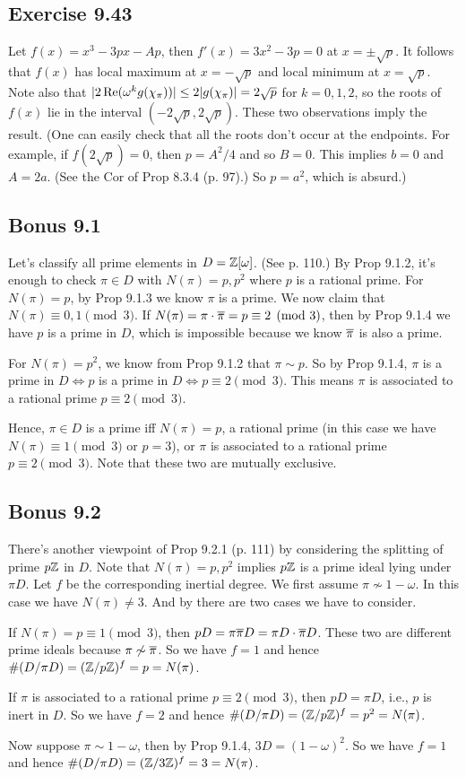 \documentclass[../I&R.tex]{subfiles}
\begin{document}
\subsection*{Exercise 9.43}

Let $f(x)=x^3-3px-Ap$, then $f'(x)=3x^2-3p=0$ at $x=\pm\sqrt{p}$. It follows that $f(x)$ has local maximum at $x=-\sqrt{p}$ and local minimum at $x=\sqrt{p}$. Note also that $|2\operatorname{Re}(\omega^kg(\chi_\pi))|\leq2|g(\chi_\pi)|=2\sqrt{p}$ for $k=0,1,2$, so the roots of $f(x)$ lie in the interval $(-2\sqrt{p},2\sqrt{p})$. These two observations imply the result. (One can easily check that all the roots don't occur at the endpoints. For example, if $f(2\sqrt{p})=0$, then $p=A^2/4$ and so $B=0$. This implies $b=0$ and $A=2a$. (See the Cor of Prop 8.3.4 (p. 97).) So $p=a^2$, which is absurd.)

\subsection*{Bonus 9.1} \label{Bonus 9.1}

Let's classify all prime elements in $D=\mathbb{Z}[\omega]$. (See p. 110.) By Prop 9.1.2, it's enough to check $\pi\in D$ with $N(\pi)=p,p^2$ where $p$ is a rational prime. For $N(\pi)=p$, by Prop 9.1.3 we know $\pi$ is a prime. We now claim that $N(\pi)\equiv0,1\pmod{3}$. If $N(\pi)=\pi\cdot\overline{\pi}=p\equiv2\pmod{3}$, then by Prop 9.1.4 we have $p$ is a prime in $D$, which is impossible because we know $\overline{\pi}$ is also a prime.

For $N(\pi)=p^2$, we know from Prop 9.1.2 that $\pi\sim p$. So by Prop 9.1.4, $\pi$ is a prime in $D \iff p$ is a prime in $D\iff p\equiv 2\pmod{3}$. This means $\pi$ is associated to a rational prime $p\equiv 2\pmod{3}$.

Hence, $\pi\in D$ is a prime iff $N(\pi)=p$, a rational prime (in this case we have $N(\pi)\equiv1\pmod{3}$ or $p=3$), or $\pi$ is associated to a rational prime $p\equiv 2\pmod{3}$. Note that these two are mutually exclusive.

\subsection*{Bonus 9.2}

There's another viewpoint of Prop 9.2.1 (p. 111) by considering the splitting of prime $p\mathbb{Z}$ in $D$. Note that $N(\pi)=p,p^2$ implies $p\mathbb{Z}$ is a prime ideal lying under $\pi D$. Let $f$ be the corresponding inertial degree. We first assume $\pi\not\sim1-\omega$. In this case we have $N(\pi)\neq3$. And by  there are two cases we have to consider.

If $N(\pi)=p\equiv1\pmod{3}$, then $pD=\pi\overline{\pi}D=\pi D\cdot\overline{\pi}D$. These two are different prime ideals because $\pi\not\sim\overline{\pi}$. So we have $f=1$ and hence $\#(D/\pi D)=(\mathbb{Z}/p\mathbb{Z})^f=p=N(\pi)$.

If $\pi$ is associated to a rational prime $p\equiv 2\pmod{3}$, then $pD=\pi D$, i.e., $p$ is inert in $D$. So we have $f=2$ and hence $\#(D/\pi D)=(\mathbb{Z}/p\mathbb{Z})^f=p^2=N(\pi)$.

Now suppose $\pi\sim1-\omega$, then by Prop 9.1.4, $3D=(1-\omega)^2$. So we have $f=1$ and hence $\#(D/\pi D)=(\mathbb{Z}/3\mathbb{Z})^f=3=N(\pi)$.
\end{document}

